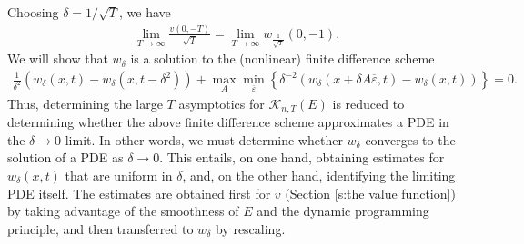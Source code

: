 \documentclass[reqno]{amsart}
\numberwithin{equation}{section}
\begin{document}
Choosing $\delta = 1/\sqrt{T}$, we have
\begin{align*}
  \lim_{T\to \infty} \frac{v(0,-T)}{\sqrt{T}} = \lim\limits_{T\to\infty} w_{\frac{1}{\sqrt{T}}}(0,-1). 
\end{align*}
We will show  that $w_\delta$ is a solution to the (nonlinear) finite difference scheme
\begin{align}\label{e:intro finite difference scheme}
  \tfrac{1}{\delta^2}(w_\delta(x,t)-w_\delta(x,t-\delta^2))+\max_A\min_{\overline \varepsilon}\left \{ \delta^{-2}(w_\delta(x+\delta A\overline\varepsilon,t)-w_\delta(x,t)) \right \} = 0.
\end{align}
Thus, determining the large $T$ asymptotics for $\mathcal K_{n,T}(E)$ is reduced to determining whether the above finite difference scheme approximates a PDE in the $\delta \to 0$ limit. In other words, we must determine whether $w_\delta$ converges to the solution of a PDE as $\delta \to 0$. This entails, on one hand, obtaining estimates for $w_\delta(x,t)$ that are uniform in $\delta$, and, on the other hand, identifying the limiting PDE itself. The estimates are obtained first for $v$ (Section \ref{s:the value function}) by taking advantage of the smoothness of $E$ and the dynamic programming principle, and then transferred to $w_\delta$ by rescaling. 
\end{document}
